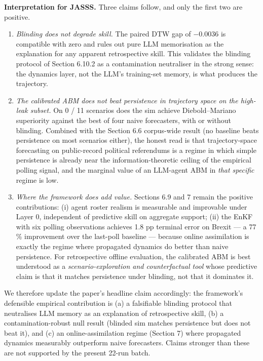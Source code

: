 \documentclass[
]{article}
\begin{document}
\textbf{Interpretation for JASSS.} Three claims follow, and only the
first two are positive.

\begin{enumerate}
\def\labelenumi{\arabic{enumi}.}
\item
  \emph{Blinding does not degrade skill.} The paired DTW gap of
  \(-0.0036\) is compatible with zero and rules out pure LLM
  memorisation as the explanation for any apparent retrospective skill.
  This validates the blinding protocol of Section 6.10.2 as a
  contamination neutraliser in the strong sense: the dynamics layer, not
  the LLM's training-set memory, is what produces the trajectory.
\item
  \emph{The calibrated ABM does not beat persistence in trajectory space
  on the high-leak subset.} On 0 / 11 scenarios does the sim achieve
  Diebold--Mariano superiority against the best of four naive
  forecasters, with or without blinding. Combined with the Section 6.6
  corpus-wide result (no baseline beats persistence on most scenarios
  either), the honest read is that trajectory-space forecasting on
  public-record political referendums is a regime in which simple
  persistence is already near the information-theoretic ceiling of the
  empirical polling signal, and the marginal value of an LLM-agent ABM
  in \emph{that specific} regime is low.
\item
  \emph{Where the framework does add value.} Sections 6.9 and 7 remain
  the positive contributions: (i) agent roster realism is measurable and
  improvable under Layer 0, independent of predictive skill on aggregate
  support; (ii) the EnKF with six polling observations achieves 1.8 pp
  terminal error on Brexit --- a 77 \% improvement over the last-poll
  baseline --- because online assimilation is exactly the regime where
  propagated dynamics do better than naive persistence. For
  retrospective offline evaluation, the calibrated ABM is best
  understood as a \emph{scenario-exploration and counterfactual tool}
  whose predictive claim is that it matches persistence under blinding,
  not that it dominates it.
\end{enumerate}

We therefore update the paper's headline claim accordingly: the
framework's defensible empirical contribution is (a) a falsifiable
blinding protocol that neutralises LLM memory as an explanation of
retrospective skill, (b) a contamination-robust null result (blinded sim
matches persistence but does not beat it), and (c) an
online-assimilation regime (Section 7) where propagated dynamics
measurably outperform naive forecasters. Claims stronger than these are
not supported by the present 22-run batch.
\end{document}
